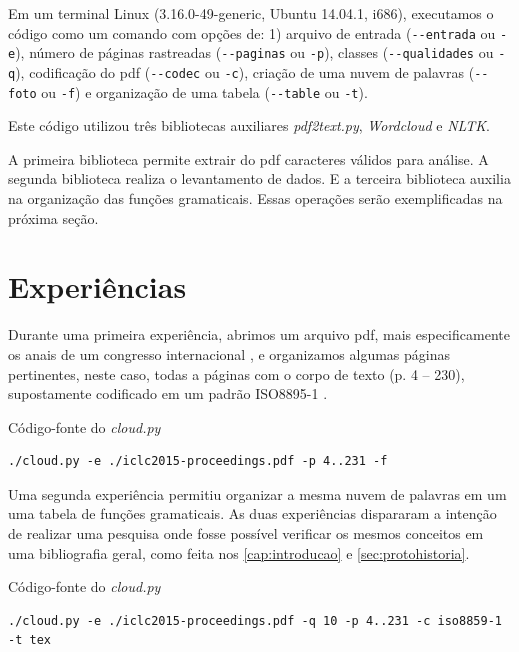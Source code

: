 Em um terminal Linux (3.16.0-49-generic, Ubuntu 14.04.1, i686), executamos o código como um comando  com opções de: 1) arquivo de entrada (\verb|--entrada| ou \verb|-e|), número de páginas rastreadas (\verb|--paginas| ou \verb|-p|), classes (\verb|--qualidades| ou \verb|-q|), codificação do pdf (\verb|--codec| ou \verb|-c|), criação de uma nuvem de palavras (\verb|--foto| ou \verb|-f|) e organização de uma tabela (\verb|--table| ou \verb|-t|). 

Este código utilizou três bibliotecas auxiliares \emph{pdf2text.py}, \emph{Wordcloud} e \emph{NLTK}. 

A primeira biblioteca permite extrair do pdf caracteres válidos para análise. A segunda biblioteca realiza o levantamento de dados. E a terceira biblioteca auxilia na organização das funções gramaticais. Essas operações serão exemplificadas na próxima seção.

\section{Experiências}

Durante uma primeira experiência, abrimos um arquivo pdf, mais especificamente os anais de um congresso internacional \cite{ICLC2015}, e organizamos algumas páginas pertinentes, neste caso, todas a páginas com o corpo de texto (p. 4 -- 230),  supostamente codificado em um padrão ISO8895-1 .

\begin{example}{Código-fonte do \emph{cloud.py}}
\begin{verbatim}
./cloud.py -e ./iclc2015-proceedings.pdf -p 4..231 -f
\end{verbatim}
\end{example} 

Uma segunda experiência permitiu organizar a mesma nuvem de palavras em um uma tabela de funções gramaticais. As duas experiências dispararam a intenção de realizar uma pesquisa onde fosse possível verificar os mesmos conceitos em uma bibliografia geral, como feita nos \autoref{cap:introducao} e \autoref{sec:protohistoria}.

\begin{example}{Código-fonte do \emph{cloud.py}}
\begin{verbatim}
./cloud.py -e ./iclc2015-proceedings.pdf -q 10 -p 4..231 -c iso8859-1 -t tex
\end{verbatim}
\end{example} 

